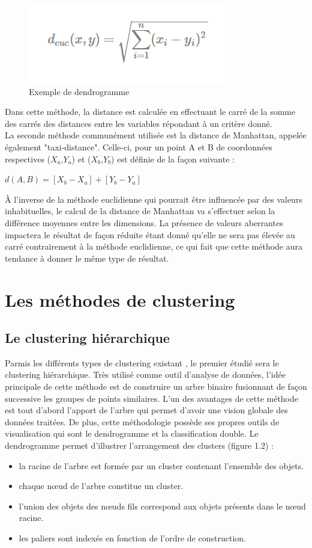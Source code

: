 \documentclass[memoire.tex]{subfiles}
\begin{document}
	\begin{figure}[h!]
		\centerline{\includegraphics[scale=0.8]{img/euclidienne_distance.png}}
		\caption{Exemple de dendrogramme}
	\end{figure}
Dans cette méthode, la distance est calculée en effectuant le carré de la somme des carrés des distances entre les variables répondant à un critère donné.\\
La seconde méthode communément utilisée est la distance de Manhattan, appelée également "taxi-distance". Celle-ci, pour un point A et B de coordonnées respectives ($X_{a}$,$Y_{a}$) et ($X_{b}$,$Y_{b}$) est définie de la façon  suivante :\\
\begin{center}
$d(A,B) = [X_{b} - X_{a}] + [Y_{b} - Y_{a}]$\\
\end{center}
À l'inverse de la méthode euclidienne qui pourrait être influencée par des valeurs inhabituelles, le calcul de la distance de Manhattan va s'effectuer selon la différence moyennes entre les dimensions. La présence de valeurs aberrantes impactera le résultat de façon réduite étant donné qu'elle ne sera pas élevée au carré contrairement à la méthode euclidienne, ce qui fait que cette méthode aura tendance à donner le même type de résultat.
\newpage
\section{Les méthodes de clustering}
		\subsection{Le clustering hiérarchique}
Parmis les différents types de clustering existant \cite{ref4}, le premier étudié sera le clustering hiérarchique. Très utilisé comme outil d'analyse de données, l'idée principale de cette méthode est de construire un arbre binaire fusionnant de façon successive les groupes de points similaires. L'un des avantages de cette méthode est tout d'abord l'apport de l'arbre qui permet d'avoir une vision globale des données traitées. De plus, cette méthodologie possède ses propres outils de visualisation qui sont le dendrogramme et la classification double. Le dendrogramme permet d'illustrer l'arrangement des clusters (figure 1.2)\cite{ref8} :
\begin{itemize}
\item la racine de l'arbre est formée par un cluster contenant l'ensemble des objets.
\item chaque nœud de l'arbre constitue un cluster.
\item l'union des objets des nœuds fils correspond aux objets présents dans le nœud racine.
\item les paliers sont indexés en fonction de l'ordre de construction.
\end{itemize}
\end{document}
